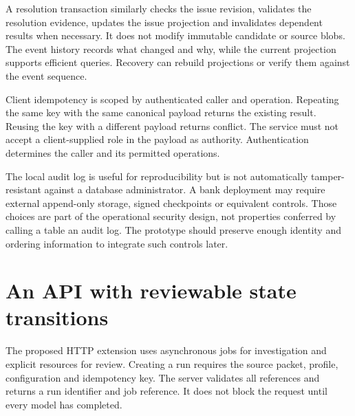 \documentclass[12pt,a4paper,oneside,openany]{book}
\begin{document}
A resolution transaction similarly checks the issue revision, validates the
resolution evidence, updates the issue projection and invalidates dependent
results when necessary. It does not modify immutable candidate or source blobs.
The event history records what changed and why, while the current projection
supports efficient queries. Recovery can rebuild projections or verify them
against the event sequence.

Client idempotency is scoped by authenticated caller and operation. Repeating the
same key with the same canonical payload returns the existing result. Reusing the
key with a different payload returns conflict. The service must not accept a
client-supplied role in the payload as authority. Authentication determines the
caller and its permitted operations.

The local audit log is useful for reproducibility but is not automatically
 tamper-resistant against a database administrator. A bank deployment may require
external append-only storage, signed checkpoints or equivalent controls. Those
choices are part of the operational security design, not properties conferred by
calling a table an audit log. The prototype should preserve enough identity and
ordering information to integrate such controls later.

\section{An API with reviewable state transitions}
\label{merge:M08:07}


The proposed HTTP extension uses asynchronous jobs for investigation and explicit
resources for review. Creating a run requires the source packet, profile,
configuration and idempotency key. The server validates all references and returns
a run identifier and job reference. It does not block the request until every
model has completed.
\end{document}
